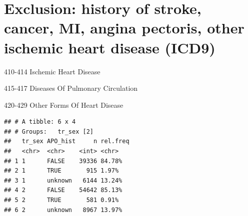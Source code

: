 \documentclass[]{article}
\newenvironment{Shaded}{\begin{snugshade}}{\end{snugshade}}
\newcommand{\DataTypeTok}[1]{\textcolor[rgb]{0.13,0.29,0.53}{#1}}
\newcommand{\DecValTok}[1]{\textcolor[rgb]{0.00,0.00,0.81}{#1}}
\newcommand{\KeywordTok}[1]{\textcolor[rgb]{0.13,0.29,0.53}{\textbf{#1}}}
\newcommand{\NormalTok}[1]{#1}
\newcommand{\OperatorTok}[1]{\textcolor[rgb]{0.81,0.36,0.00}{\textbf{#1}}}
\newcommand{\OtherTok}[1]{\textcolor[rgb]{0.56,0.35,0.01}{#1}}
\newcommand{\StringTok}[1]{\textcolor[rgb]{0.31,0.60,0.02}{#1}}
\begin{document}
\hypertarget{exclusion-history-of-stroke-cancer-mi-angina-pectoris-other-ischemic-heart-disease-icd9}{%
\section{Exclusion: history of stroke, cancer, MI, angina pectoris,
other ischemic heart disease
(ICD9)}\label{exclusion-history-of-stroke-cancer-mi-angina-pectoris-other-ischemic-heart-disease-icd9}}

410-414 Ischemic Heart Disease

415-417 Diseases Of Pulmonary Circulation

420-429 Other Forms Of Heart Disease

\begin{Shaded}
\end{Shaded}

\begin{verbatim}
## # A tibble: 6 x 4
## # Groups:   tr_sex [2]
##   tr_sex APO_hist     n rel.freq
##   <chr>  <chr>    <int> <chr>   
## 1 1      FALSE    39336 84.78%  
## 2 1      TRUE       915 1.97%   
## 3 1      unknown   6144 13.24%  
## 4 2      FALSE    54642 85.13%  
## 5 2      TRUE       581 0.91%   
## 6 2      unknown   8967 13.97%
\end{verbatim}

\begin{Shaded}
\end{Shaded}
\end{document}
